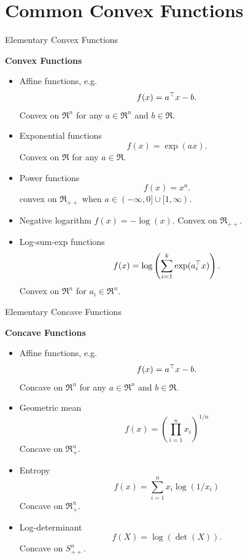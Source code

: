 \documentclass[9pt]{beamer}
\begin{document}

  

\section{Common Convex Functions}


\begin{frame}{Elementary Convex Functions}

  \textbf{Convex Functions}
  \begin{itemize}
  \item Affine functions, e.g.\
    \[
      f(x) = a^\top x - b.
    \]
    Convex on $\Re^n$ for any $a\in\Re^{n}$ and $b\in\Re$.
  \item<2-> Exponential functions
    \[
      f(x) = \exp(a x).
    \]
    Convex on $\Re$ for any $a\in\Re$.
  \item<3-> Power functions
    \[
      f(x) = x^a.
    \]
    convex on $\Re_{++}$ when $a\in (-\infty, 0]\cup [1, \infty)$.
  \item<3-> Negative logarithm $f(x) = -\log(x)$. Convex on $\Re_{++}$.
  \item<4-> Log-sum-exp functions
    \[
      f(x) = \log\left(\sum_{i=1}^k \exp(a_i^\top x)\right).
    \]
    Convex on $\Re^n$ for $a_i\in\Re^n$.
  \end{itemize}
  
\end{frame}

\begin{frame}{Elementary Concave Functions}

  \textbf{Concave Functions}
  \begin{itemize}
  \item Affine functions, e.g.\
    \[
      f(x) = a^\top x - b.
    \]
    Concave on $\Re^n$ for any $a\in\Re^{n}$ and $b\in\Re$.
  \item<2-> Geometric mean
    \[
      f(x) = \left(\prod_{i=1}^n x_i\right)^{1/n}
    \]
    Concave on $\Re^n_{+}$.
  \item<3-> Entropy
    \[
      f(x) = \sum_{i=1}^n x_i \log(1/x_i)
    \]
    Concave on $\Re_+^n$.
  \item<4-> Log-determinant
    \[
      f(X) = \log(\det(X)).
    \]
    Concave on $S^{n}_{++}$.
  \end{itemize}

  
\end{frame}
\end{document}
